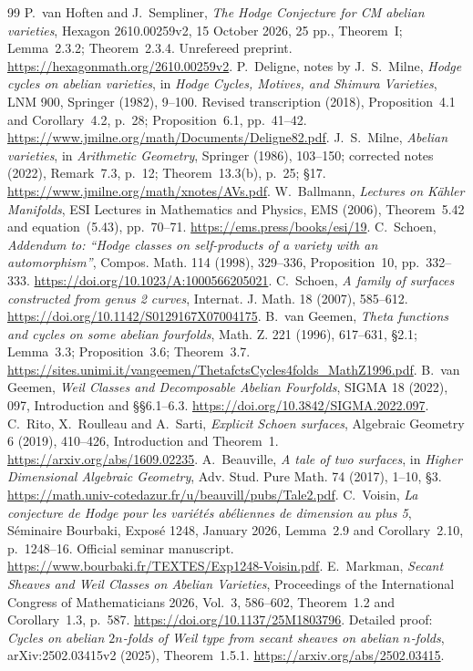 \begin{thebibliography}{99}
 P.~van Hoften and J.~Sempliner, \emph{The Hodge Conjecture for CM abelian varieties}, Hexagon 2610.00259v2, 15 October 2026, 25 pp., Theorem~I; Lemma~2.3.2; Theorem~2.3.4. Unrefereed preprint. \url{https://hexagonmath.org/2610.00259v2}.
 P.~Deligne, notes by J.~S.~Milne, \emph{Hodge cycles on abelian varieties}, in \emph{Hodge Cycles, Motives, and Shimura Varieties}, LNM 900, Springer (1982), 9--100. Revised transcription (2018), Proposition~4.1 and Corollary~4.2, p.~28; Proposition~6.1, pp.~41--42. \url{https://www.jmilne.org/math/Documents/Deligne82.pdf}.
 J.~S.~Milne, \emph{Abelian varieties}, in \emph{Arithmetic Geometry}, Springer (1986), 103--150; corrected notes (2022), Remark~7.3, p.~12; Theorem~13.3(b), p.~25; \S17. \url{https://www.jmilne.org/math/xnotes/AVs.pdf}.
 W.~Ballmann, \emph{Lectures on K\"ahler Manifolds}, ESI Lectures in Mathematics and Physics, EMS (2006), Theorem~5.42 and equation~(5.43), pp.~70--71. \url{https://ems.press/books/esi/19}.
 C.~Schoen, \emph{Addendum to: ``Hodge classes on self-products of a variety with an automorphism''}, Compos. Math. 114 (1998), 329--336, Proposition~10, pp.~332--333. \url{https://doi.org/10.1023/A:1000566205021}.
 C.~Schoen, \emph{A family of surfaces constructed from genus 2 curves}, Internat. J. Math. 18 (2007), 585--612. \url{https://doi.org/10.1142/S0129167X07004175}.
 B.~van Geemen, \emph{Theta functions and cycles on some abelian fourfolds}, Math. Z. 221 (1996), 617--631, \S2.1; Lemma~3.3; Proposition~3.6; Theorem~3.7. \url{https://sites.unimi.it/vangeemen/ThetafctsCycles4folds_MathZ1996.pdf}.
 B.~van Geemen, \emph{Weil Classes and Decomposable Abelian Fourfolds}, SIGMA 18 (2022), 097, Introduction and \S\S6.1--6.3. \url{https://doi.org/10.3842/SIGMA.2022.097}.
 C.~Rito, X.~Roulleau and A.~Sarti, \emph{Explicit Schoen surfaces}, Algebraic Geometry 6 (2019), 410--426, Introduction and Theorem~1. \url{https://arxiv.org/abs/1609.02235}.
 A.~Beauville, \emph{A tale of two surfaces}, in \emph{Higher Dimensional Algebraic Geometry}, Adv. Stud. Pure Math. 74 (2017), 1--10, \S3. \url{https://math.univ-cotedazur.fr/u/beauvill/pubs/Tale2.pdf}.
 C.~Voisin, \emph{La conjecture de Hodge pour les vari\'et\'es ab\'eliennes de dimension au plus 5}, S\'eminaire Bourbaki, Expos\'e 1248, January 2026, Lemma~2.9 and Corollary~2.10, p.~1248--16. Official seminar manuscript. \url{https://www.bourbaki.fr/TEXTES/Exp1248-Voisin.pdf}.
 E.~Markman, \emph{Secant Sheaves and Weil Classes on Abelian Varieties}, Proceedings of the International Congress of Mathematicians 2026, Vol.~3, 586--602, Theorem~1.2 and Corollary~1.3, p.~587. \url{https://doi.org/10.1137/25M1803796}. Detailed proof: \emph{Cycles on abelian $2n$-folds of Weil type from secant sheaves on abelian $n$-folds}, arXiv:2502.03415v2 (2025), Theorem~1.5.1. \url{https://arxiv.org/abs/2502.03415}.

\end{thebibliography}
